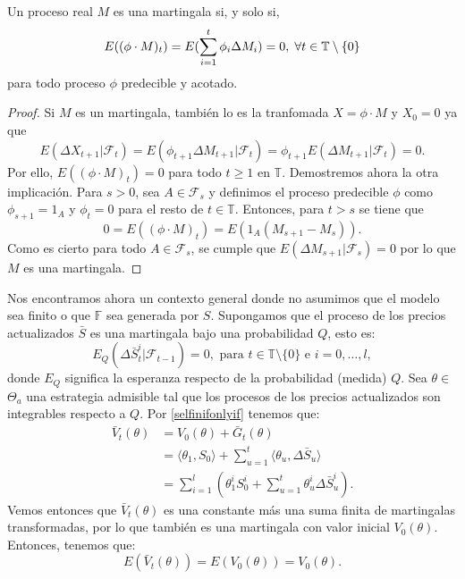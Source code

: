 \bigskip
\begin{teoremaBox}\label{2.3.5}
	Un proceso real $ M $ es una martingala si, y solo si, 
	\[
	E((\phi \cdot M)_t) = E(\sum_{i=1}^{t}\phi_i\Delta M_i) = 0, \hspace{1mm} \forall t \in \mathbb{T}\setminus\{0\}
	\]
	para todo proceso $ \phi $ predecible y acotado.
\end{teoremaBox}
\begin{proof}
	Si $ M $ es un martingala, también lo es la tranfomada $ X = \phi \cdot M $ y $ X_0 =0 $ ya que
	\[
	E(\Delta X_{t+1}|\mathcal{F}_t) = E(\phi_{t+1}\Delta M_{t+1}|\mathcal{F}_t) =  \phi_{t+1} E(\Delta M_{t+1}|\mathcal{F}_t) = 0.
	\] 
	Por ello, $ E((\phi \cdot M)_t) = 0 $ para todo $ t \geq 1 $ en $ \mathbb{T} $.
	Demostremos ahora la otra implicación. Para $ s > 0 $, sea $ A \in \mathcal{F}_s $ y definimos el proceso predecible $ \phi $ como $ \phi_{s+1} = 1_A $ y $ \phi_t = 0 $ para el resto de $ t\in \mathbb{T} $. Entonces, para $ t > s $ se tiene que
	\[
	0 = E((\phi \cdot M)_t) = E(1_A(M_{s+1}-M_s)).
	\]
	Como es cierto para todo $ A \in \mathcal{F}_s $, se cumple que $ E(\Delta M_{s+1} | \mathcal{F}_s) = 0 $ por lo que $ M $ es una martingala.
\end{proof}
\bigskip
Nos encontramos ahora un contexto general donde no asumimos que el modelo sea finito o que $ \mathbb{F} $ sea generada por $ S $. Supongamos que el proceso de los precios actualizados $ \bar{S} $ es una martingala bajo una probabilidad $ Q $, esto es:
\[
E_Q (\Delta \bar{S}^i_t | \mathcal{F}_{t-1}) = 0, \text{ para } t \in \mathbb{T}\setminus \{0\} \text{ e } i = 0,\dots,l,
\]
donde $ E_Q $ significa la esperanza respecto de la probabilidad (medida) $ Q $. Sea $ \theta \in $\nolinebreak$ \Theta_a $ una estrategia admisible tal que los procesos de los precios actualizados son integrables respecto a $ Q $. Por \eqref{selfinifonlyif} tenemos que:
\begin{equation*}
\begin{split}
\bar{V}_t(\theta) &= V_0(\theta) + \bar{G}_t(\theta) \\
&= \langle \theta_{1}, S_0 \rangle + \sum_{u=1}^{t} \langle \theta_{u}, \Delta \bar{S}_u \rangle \\
&= \sum_{i=1}^{l}(\theta_1^i S_0^i + \sum_{u=1}^{t} \theta_{u}^i \Delta \bar{S}_u^i).
\end{split}
\end{equation*}
Vemos entonces que $ \bar{V}_t(\theta) $ es una constante más una suma finita de martingalas transformadas, por lo que también es una martingala con valor inicial $ V_0 (\theta) $. Entonces, tenemos que: \[ E(\bar{V}_t (\theta)) = E(V_0 (\theta)) = V_0(\theta) .\] 

